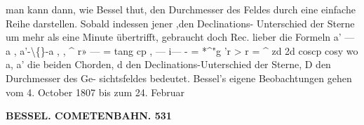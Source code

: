 \documentclass[12pt,a4paper]{article}
\begin{document}
 man  kann  dann,  wie  Bessel  thut,  den  Durchmesser  des  Feldes  durch eine  einfache  Reihe  darstellen.  Sobald  indessen  jener  ,den  Declinations- Unterschied  der  Sterne  um mehr  als  eine  Minute  übertrifft,  gebraucht  doch  Rec.  lieber  die  Formeln a' --- a         ,  a'-\textbackslash\{\}-a         ,  ,  \textasciicircum{}  r» ---  =  tang  cp ,  --- i--- -  =  *\textasciicircum{}"g  'r  >    r  =  \textasciicircum{} zd  2d  coscp  cosy wo   a,  a'  die  beiden  Chorden,    d  den  Declinations-Uuterschied  der  Sterne,  D  den  Durchmesser  des  Ge- sichtsfeldes bedeutet.     Bessel's  eigene  Beobachtungen  gehen  vom  4.  October   1807   bis  zum   24.  Februar

\vspace{0.5em}


\noindent\textbf{BESSEL.      COMETENBAHN.  531}
\end{document}
